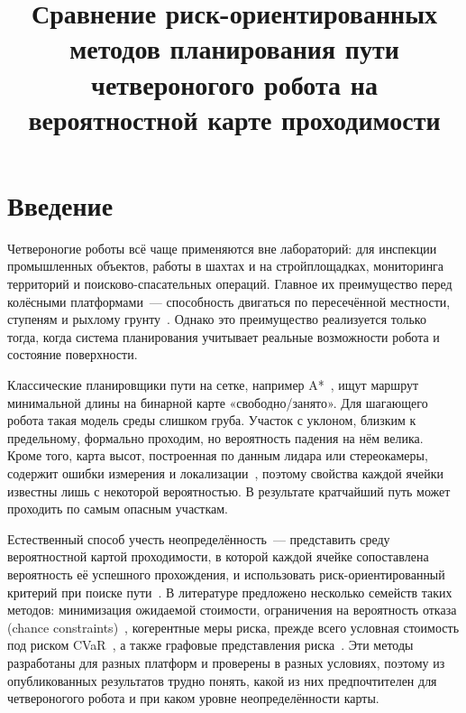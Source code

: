 \documentclass{misisarticle}
\title{Сравнение риск-ориентированных методов планирования пути четвероногого робота на вероятностной карте проходимости}
\begin{document}
\maketitle

\section{Введение}

Четвероногие роботы всё чаще применяются вне лабораторий: для инспекции промышленных объектов, работы в шахтах и на стройплощадках, мониторинга территорий и поисково-спасательных операций. Главное их преимущество перед колёсными платформами~--- способность двигаться по пересечённой местности, ступеням и рыхлому грунту~\cite{miki2022, wellhausen2023}. Однако это преимущество реализуется только тогда, когда система планирования учитывает реальные возможности робота и состояние поверхности.

Классические планировщики пути на сетке, например A*~\cite{hart1968}, ищут маршрут минимальной длины на бинарной карте «свободно/занято». Для шагающего робота такая модель среды слишком груба. Участок с уклоном, близким к предельному, формально проходим, но вероятность падения на нём велика. Кроме того, карта высот, построенная по данным лидара или стереокамеры, содержит ошибки измерения и локализации~\cite{fankhauser2018, thrun2005}, поэтому свойства каждой ячейки известны лишь с некоторой вероятностью. В результате кратчайший путь может проходить по самым опасным участкам.

Естественный способ учесть неопределённость~--- представить среду вероятностной картой проходимости, в которой каждой ячейке сопоставлена вероятность её успешного прохождения, и использовать риск-ориентированный критерий при поиске пути~\cite{fan2021, akella2024}. В литературе предложено несколько семейств таких методов: минимизация ожидаемой стоимости, ограничения на вероятность отказа (chance constraints)~\cite{blackmore2011}, когерентные меры риска, прежде всего условная стоимость под риском CVaR~\cite{rockafellar2000, majumdar2020}, а также графовые представления риска~\cite{lee2025}. Эти методы разработаны для разных платформ и проверены в разных условиях, поэтому из опубликованных результатов трудно понять, какой из них предпочтителен для четвероногого робота и при каком уровне неопределённости карты.
\end{document}
